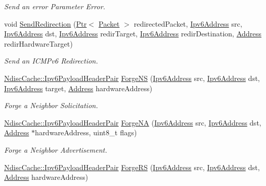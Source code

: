 \begin{DoxyCompactItemize}
\begin{DoxyCompactList}\small\item\em Send an error Parameter Error. \end{DoxyCompactList}\item 
void \hyperlink{classns3_1_1Icmpv6L4Protocol_a775f19603b15e25f287f54096a3f26cb}{Send\+Redirection} (\hyperlink{classns3_1_1Ptr}{Ptr}$<$ \hyperlink{classns3_1_1Packet}{Packet} $>$ redirected\+Packet, \hyperlink{classns3_1_1Ipv6Address}{Ipv6\+Address} src, \hyperlink{classns3_1_1Ipv6Address}{Ipv6\+Address} dst, \hyperlink{classns3_1_1Ipv6Address}{Ipv6\+Address} redir\+Target, \hyperlink{classns3_1_1Ipv6Address}{Ipv6\+Address} redir\+Destination, \hyperlink{classns3_1_1Address}{Address} redir\+Hardware\+Target)
\begin{DoxyCompactList}\small\item\em Send an I\+C\+M\+Pv6 Redirection. \end{DoxyCompactList}\item 
\hyperlink{classns3_1_1NdiscCache_a29c07f4c9da0e923f442f6440666240e}{Ndisc\+Cache\+::\+Ipv6\+Payload\+Header\+Pair} \hyperlink{classns3_1_1Icmpv6L4Protocol_adb98e7ef239b59c186a7c96bf9735068}{Forge\+NS} (\hyperlink{classns3_1_1Ipv6Address}{Ipv6\+Address} src, \hyperlink{classns3_1_1Ipv6Address}{Ipv6\+Address} dst, \hyperlink{classns3_1_1Ipv6Address}{Ipv6\+Address} target, \hyperlink{classns3_1_1Address}{Address} hardware\+Address)
\begin{DoxyCompactList}\small\item\em Forge a Neighbor Solicitation. \end{DoxyCompactList}\item 
\hyperlink{classns3_1_1NdiscCache_a29c07f4c9da0e923f442f6440666240e}{Ndisc\+Cache\+::\+Ipv6\+Payload\+Header\+Pair} \hyperlink{classns3_1_1Icmpv6L4Protocol_a687a096d8c5580cb3a80bec95b0dd689}{Forge\+NA} (\hyperlink{classns3_1_1Ipv6Address}{Ipv6\+Address} src, \hyperlink{classns3_1_1Ipv6Address}{Ipv6\+Address} dst, \hyperlink{classns3_1_1Address}{Address} $\ast$hardware\+Address, uint8\+\_\+t flags)
\begin{DoxyCompactList}\small\item\em Forge a Neighbor Advertisement. \end{DoxyCompactList}\item 
\hyperlink{classns3_1_1NdiscCache_a29c07f4c9da0e923f442f6440666240e}{Ndisc\+Cache\+::\+Ipv6\+Payload\+Header\+Pair} \hyperlink{classns3_1_1Icmpv6L4Protocol_ad9a2cfbf2b47401ba857e937081612c2}{Forge\+RS} (\hyperlink{classns3_1_1Ipv6Address}{Ipv6\+Address} src, \hyperlink{classns3_1_1Ipv6Address}{Ipv6\+Address} dst, \hyperlink{classns3_1_1Address}{Address} hardware\+Address)

\end{DoxyCompactItemize}
